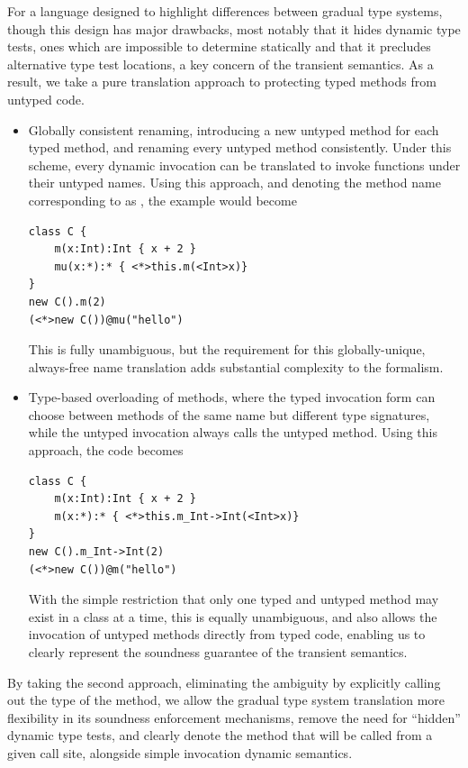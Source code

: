 \documentclass[a4paper,USenglish]{tex/lipics-v2016}
\begin{document}
For a language designed to highlight differences between gradual type systems, though
this design has major drawbacks, most notably that it hides dynamic type tests, ones
which are impossible to determine statically and that it precludes alternative type
test locations, a key concern of the transient semantics. As a result, we take a pure
translation approach to protecting typed methods from untyped code.

\begin{itemize}
  \item Globally consistent renaming, introducing a new untyped method for each
  typed method, and renaming every untyped method consistently. Under this scheme,
  every dynamic invocation can be translated to invoke functions under their untyped
  names. Using this approach, and denoting the method name corresponding to \m as 
  , the example would become

\begin{verbatim}
class C {
    m(x:Int):Int { x + 2 }
    mu(x:*):* { <*>this.m(<Int>x)}
}
new C().m(2)
(<*>new C())@mu("hello")
\end{verbatim}

This is fully unambiguous, but the requirement for this globally-unique, always-free
name translation adds substantial complexity to the formalism.
\item Type-based overloading of methods, where the typed invocation form can choose
between methods of the same name but different type signatures, while the untyped
invocation always calls the untyped method. Using this approach, the code becomes

\begin{verbatim}
class C {
    m(x:Int):Int { x + 2 }
    m(x:*):* { <*>this.m_Int->Int(<Int>x)}
}
new C().m_Int->Int(2)
(<*>new C())@m("hello")
\end{verbatim}

With the simple restriction that only one typed and untyped method may
exist in a class at a time, this is equally unambiguous, and also allows
the invocation of untyped methods directly from typed code, enabling us
to clearly represent the soundness guarantee of the transient semantics.

\end{itemize}

By taking the second approach, eliminating the ambiguity by explicitly
calling out the type of the method, we allow the gradual type system
translation more flexibility in its soundness enforcement mechanisms,
remove the need for ``hidden'' dynamic type tests, and clearly denote
the method that will be called from a given call site, alongside 
simple invocation dynamic semantics.
\end{document}
